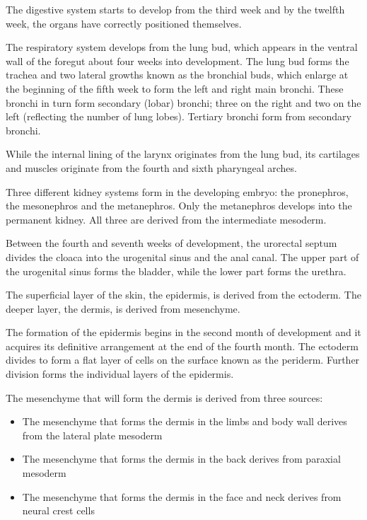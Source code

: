 The digestive system starts to develop from the third week and by the twelfth week, the organs have correctly positioned themselves.

The respiratory system develops from the lung bud, which appears in the ventral wall of the foregut about four weeks into development. The lung bud forms the trachea and two lateral growths known as the bronchial buds, which enlarge at the beginning of the fifth week to form the left and right main bronchi. These bronchi in turn form secondary (lobar) bronchi; three on the right and two on the left (reflecting the number of lung lobes). Tertiary bronchi form from secondary bronchi.

While the internal lining of the larynx originates from the lung bud, its cartilages and muscles originate from the fourth and sixth pharyngeal arches.

Three different kidney systems form in the developing embryo: the pronephros, the mesonephros and the metanephros. Only the metanephros develops into the permanent kidney. All three are derived from the intermediate mesoderm.

Between the fourth and seventh weeks of development, the urorectal septum divides the cloaca into the urogenital sinus and the anal canal. The upper part of the urogenital sinus forms the bladder, while the lower part forms the urethra.

The superficial layer of the skin, the epidermis, is derived from the ectoderm. The deeper layer, the dermis, is derived from mesenchyme.

The formation of the epidermis begins in the second month of development and it acquires its definitive arrangement at the end of the fourth month. The ectoderm divides to form a flat layer of cells on the surface known as the periderm. Further division forms the individual layers of the epidermis.

The mesenchyme that will form the dermis is derived from three sources:

\begin{itemize}
\tightlist
\item
  The mesenchyme that forms the dermis in the limbs and body wall derives from the lateral plate mesoderm
\item
  The mesenchyme that forms the dermis in the back derives from paraxial mesoderm
\item
  The mesenchyme that forms the dermis in the face and neck derives from neural crest cells
\end{itemize}

